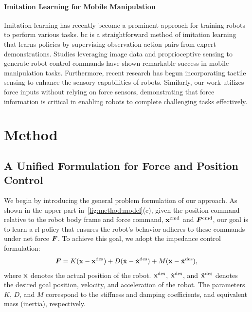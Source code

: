 \documentclass{article}
\begin{document}
\paragraph{Imitation Learning for Mobile Manipulation}
Imitation learning \cite{bousmalis2023robocat,mees2024octo,vuong2023open, yang2023polybot,fang2024rh20t} has recently become a prominent approach for training robots to perform various tasks. \ac{bc} \cite{pomerleau1988alvinn,bojarski2016endendlearningselfdriving} is a straightforward method of imitation learning that learns policies by supervising observation-action pairs from expert demonstrations. Studies leveraging image data and proprioceptive sensing \cite{fu2024mobile,ha2024umi,he2024learning,qiu2024wildlma} to generate robot control commands have shown remarkable success in mobile manipulation tasks. Furthermore, recent research \cite{lin2024learning,yang2023seq2seq} has begun incorporating tactile sensing to enhance the sensory capabilities of robots. Similarly, our work utilizes force inputs without relying on force sensors, demonstrating that force information is critical in enabling robots to complete challenging tasks effectively.


\section{Method} \label{sec:method}
\subsection{A Unified Formulation for Force and Position Control}\label{sec:method:formulation}
We begin by introducing the general problem formulation of our approach. As shown in the upper part in~\cref{fig:method:model}(c), given the position command relative to the robot body frame and force command, ${\mathbf{x}}^{\text{cmd}}$ and ${\bm{F}}^{\text{cmd}}$, our goal is to learn a \ac{rl} policy that ensures the robot's behavior adheres to these commands under net force ${\bm{F}}$.
To achieve this goal, we adopt the impedance control formulation:
\begin{equation}
{\bm{F}} = K({\mathbf{x}} - {\mathbf{x}}^{\text{des}}) + D(\dot{{\mathbf{x}}} - \dot{{\mathbf{x}}}^{\text{des}}) + M(\ddot{{\mathbf{x}}} - \ddot{{\mathbf{x}}}^{\text{des}}),
\label{eq:impedance_general}
\end{equation}
where ${\mathbf{x}}$ denotes the actual position of the robot. ${\mathbf{x}}^{\text{des}}$, $\dot{{\mathbf{x}}}^{\text{des}}$, and $\ddot{{\mathbf{x}}}^{\text{des}}$ denotes the desired goal position, velocity, and acceleration of the robot. The parameters $K$, $D$, and $M$ correspond to the stiffness and damping coefficients, and equivalent mass (inertia), respectively.
\end{document}
